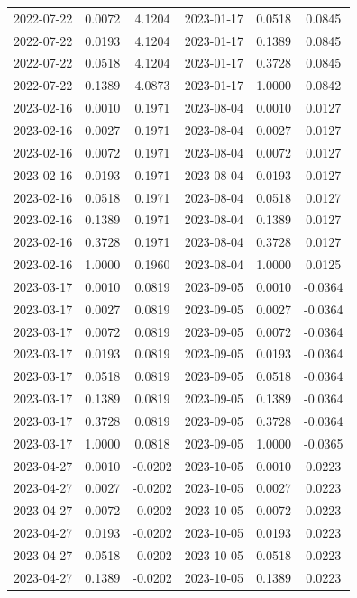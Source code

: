 \begin{footnotesize}
\begin{longtable}{lcc|lcc}
2022-07-22 & 0.0072 & 4.1204 & 2023-01-17 & 0.0518 & 0.0845 \\
2022-07-22 & 0.0193 & 4.1204 & 2023-01-17 & 0.1389 & 0.0845 \\
2022-07-22 & 0.0518 & 4.1204 & 2023-01-17 & 0.3728 & 0.0845 \\
2022-07-22 & 0.1389 & 4.0873 & 2023-01-17 & 1.0000 & 0.0842 \\
2023-02-16 & 0.0010 & 0.1971 & 2023-08-04 & 0.0010 & 0.0127 \\
2023-02-16 & 0.0027 & 0.1971 & 2023-08-04 & 0.0027 & 0.0127 \\
2023-02-16 & 0.0072 & 0.1971 & 2023-08-04 & 0.0072 & 0.0127 \\
2023-02-16 & 0.0193 & 0.1971 & 2023-08-04 & 0.0193 & 0.0127 \\
2023-02-16 & 0.0518 & 0.1971 & 2023-08-04 & 0.0518 & 0.0127 \\
2023-02-16 & 0.1389 & 0.1971 & 2023-08-04 & 0.1389 & 0.0127 \\
2023-02-16 & 0.3728 & 0.1971 & 2023-08-04 & 0.3728 & 0.0127 \\
2023-02-16 & 1.0000 & 0.1960 & 2023-08-04 & 1.0000 & 0.0125 \\
2023-03-17 & 0.0010 & 0.0819 & 2023-09-05 & 0.0010 & -0.0364 \\
2023-03-17 & 0.0027 & 0.0819 & 2023-09-05 & 0.0027 & -0.0364 \\
2023-03-17 & 0.0072 & 0.0819 & 2023-09-05 & 0.0072 & -0.0364 \\
2023-03-17 & 0.0193 & 0.0819 & 2023-09-05 & 0.0193 & -0.0364 \\
2023-03-17 & 0.0518 & 0.0819 & 2023-09-05 & 0.0518 & -0.0364 \\
2023-03-17 & 0.1389 & 0.0819 & 2023-09-05 & 0.1389 & -0.0364 \\
2023-03-17 & 0.3728 & 0.0819 & 2023-09-05 & 0.3728 & -0.0364 \\
2023-03-17 & 1.0000 & 0.0818 & 2023-09-05 & 1.0000 & -0.0365 \\
2023-04-27 & 0.0010 & -0.0202 & 2023-10-05 & 0.0010 & 0.0223 \\
2023-04-27 & 0.0027 & -0.0202 & 2023-10-05 & 0.0027 & 0.0223 \\
2023-04-27 & 0.0072 & -0.0202 & 2023-10-05 & 0.0072 & 0.0223 \\
2023-04-27 & 0.0193 & -0.0202 & 2023-10-05 & 0.0193 & 0.0223 \\
2023-04-27 & 0.0518 & -0.0202 & 2023-10-05 & 0.0518 & 0.0223 \\
2023-04-27 & 0.1389 & -0.0202 & 2023-10-05 & 0.1389 & 0.0223 \\

\end{longtable}
\end{footnotesize}
